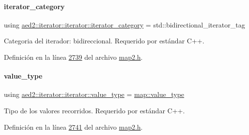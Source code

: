 \paragraph{\texorpdfstring{iterator\+\_\+category}{iterator\_category}}
{\footnotesize\ttfamily using \hyperlink{classaed2_1_1iterator_1_1iterator_ad98a0b33afe1df977c248314251fe2b2_ad98a0b33afe1df977c248314251fe2b2}{aed2\+::iterator\+::iterator\+::iterator\+\_\+category} =  std\+::bidirectional\+\_\+iterator\+\_\+tag}



Categoria del iterador\+: bidireccional. Requerido por estándar C++. 



Definición en la línea \hyperlink{map2_8h_source_l02739}{2739} del archivo \hyperlink{map2_8h_source}{map2.\+h}.

\mbox{\label{classaed2_1_1iterator_1_1iterator_a10ed10b6d144d04ae127ef846e1d4e7c_a10ed10b6d144d04ae127ef846e1d4e7c}} 
\paragraph{\texorpdfstring{value\+\_\+type}{value\_type}}
{\footnotesize\ttfamily using \hyperlink{classaed2_1_1iterator_1_1iterator_a10ed10b6d144d04ae127ef846e1d4e7c_a10ed10b6d144d04ae127ef846e1d4e7c}{aed2\+::iterator\+::iterator\+::value\+\_\+type} =  \hyperlink{classaed2_1_1map_a719db98e0ff9a837610f76be33264680_a719db98e0ff9a837610f76be33264680}{map\+::value\+\_\+type}}



Tipo de los valores recorridos. Requerido por estándar C++. 



Definición en la línea \hyperlink{map2_8h_source_l02741}{2741} del archivo \hyperlink{map2_8h_source}{map2.\+h}.

\mbox{\label{classaed2_1_1iterator_1_1iterator_a91be74b60dfc3eabfa5a69d9aa068959_a91be74b60dfc3eabfa5a69d9aa068959}} 
